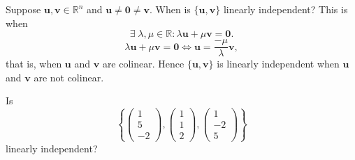 \begin{example}
    Suppose $\bm{u}, \bm{v} \in \mathbb{R}^n$ and $\bm{u} \neq \bm{0} \neq \bm{v}$. When is $\{\bm{u}, \bm{v}\}$ linearly independent? This is when \[\exists \; \lambda, \mu \in \mathbb{R} : \lambda \bm{u} + \mu \bm{v} = \bm{0}.\] \[\lambda \bm{u} + \mu \bm{v} = \bm{0} \iff \bm{u} = \frac{-\mu}{\lambda} \bm{v},\] that is, when $\bm{u}$ and $\bm{v}$ are colinear. Hence $\{\bm{u}, \bm{v}\}$ is linearly independent when $\bm{u}$ and $\bm{v}$ are not colinear. 
\end{example}

\begin{example}
    Is
    \[
        \left\{
            \begin{pmatrix}
                1 \\ 5 \\ -2
            \end{pmatrix}
            ,
            \begin{pmatrix}
                1 \\ 1 \\ 2
            \end{pmatrix}
            ,
            \begin{pmatrix}
                1 \\ -2 \\ 5
            \end{pmatrix}
        \right\}
    \]
    linearly independent?
    

\end{example}
